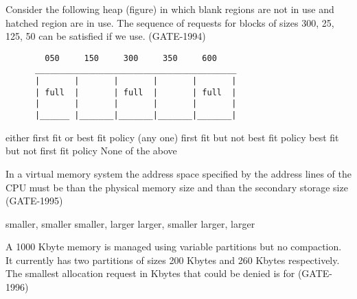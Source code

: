 
\begin{questyle}

  \question Consider the following heap (figure) in which blank regions are not in use and hatched region are in use.
            The sequence of requests for blocks of sizes 300, 25, 125, 50 can be satisfied if we use. (GATE-1994)
  \begin{lstlisting}
        050     150     300     350     600
      _________________________________________
      |       |       |       |       |       |
      | full  |       | full  |       | full  |
      |       |       |       |       |       |
      |______ |_______|_______|_______|_______|
  \end{lstlisting}

  \begin{choices}
    \choice either first fit or best fit policy (any one)
    \correctchoice first fit but not best fit policy
    \choice best fit but not first fit policy
    \choice None of the above
  \end{choices}

\end{questyle}



\begin{questyle}

  \question  In a virtual memory system the address space specified by the address lines of the CPU must be \fillin[]
            than the physical memory size and \fillin[] than the secondary storage size (GATE-1995)

  \begin{choices}
    \choice smaller, smaller
    \choice smaller, larger
    \correctchoice larger, smaller
    \choice larger, larger
  \end{choices}

\end{questyle}


\begin{questyle}

  \question  A 1000 Kbyte memory is managed using variable partitions but no compaction. It currently has two
            partitions of sizes 200 Kbytes and 260 Kbytes respectively. The smallest allocation request in Kbytes
            that could be denied is for (GATE-1996)

  \begin{oneparchoices}
  \end{oneparchoices}

\end{questyle}

